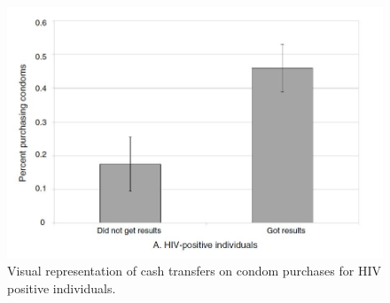 \documentclass[notes=show]{beamer}
\begin{document}
\begin{frame}[plain]

\begin{figure}[htb]\centering
\includegraphics[scale=0.5]{./lecture_includes/FigC.jpg}
\caption{Visual representation of cash transfers on condom purchases for HIV positive individuals.}
\label{fig:thorntoncondomfig}
\end{figure}

\end{frame}
\end{document}
